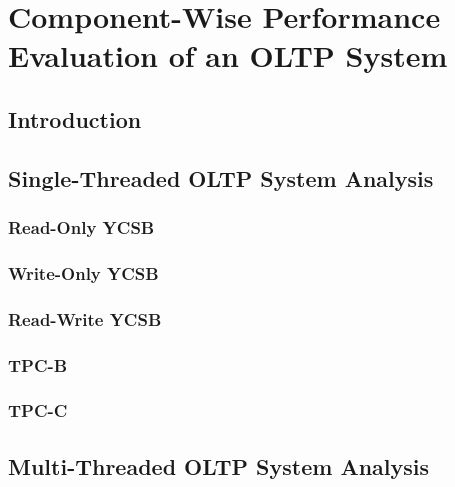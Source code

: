 \chapter{Component-Wise Performance Evaluation of an OLTP System} \label{ch:looking_glass}

\section{Introduction} \label{sec:looking_glass_intro}

    

\section{Single-Threaded OLTP System Analysis} \label{sec:looking_glass_single_threaded}

	

\subsection{Read-Only YCSB} \label{subsec:looking_glass_single_threaded_read_only_ycsb}

	

\subsection{Write-Only YCSB} \label{subsec:looking_glass_single_threaded_write_only_ycsb}

	

\subsection{Read-Write YCSB} \label{subsec:looking_glass_single_threaded_read_write_ycsb}

	

\subsection{TPC-B} \label{subsec:looking_glass_single_threaded_tpcb}

    

\subsection{TPC-C} \label{subsec:looking_glass_single_threaded_tpcc}

    

\section{Multi-Threaded OLTP System Analysis} \label{sec:looking_glass_multi-threaded}

